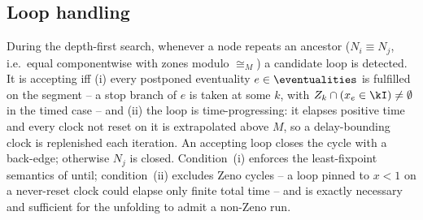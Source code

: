 \subsection{Loop handling}\label{ss:loop}

During the depth-first search, whenever a node repeats an ancestor ($N_i\equiv N_j$, i.e.\ equal
componentwise with zones modulo $\cong_M$) a {candidate loop}
is detected. It is {accepting} iff {(i)} every postponed eventuality $e\in\eventualities$ is
fulfilled on the segment -- a stop branch of $e$ is taken at some $k$, with $Z_k\cap(x_e\in\kI)\neq\emptyset$
in the timed case -- and {(ii)} the loop is {time-progressing}: it elapses positive time and every
clock not reset on it is extrapolated above $M$, so a delay-bounding clock is replenished each iteration. An
accepting loop closes the cycle with a back-edge; otherwise $N_j$ is closed. Condition~(i) enforces the
least-fixpoint semantics of until; condition~(ii) excludes Zeno cycles -- a loop pinned to $x<1$ on a
never-reset clock could elapse only finite total time -- and is exactly necessary and sufficient for the
unfolding to admit a non-Zeno run.


